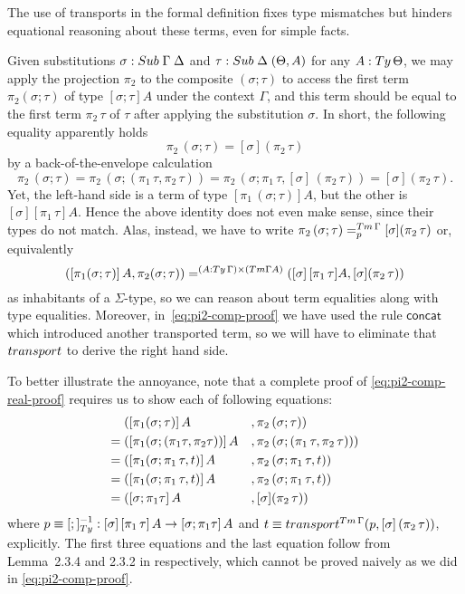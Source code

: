 \documentclass[a4paper,UKenglish,numberwithinsect,cleveref,thm-restate]{lipics-v2021}
\begin{document}
The use of transports in the formal definition fixes type mismatches but hinders equational reasoning about these terms, even for simple facts.
\begin{example}
  Given substitutions $\sigma : \Sub\;\Gamma\; \Delta$ and $\tau : \Sub\;\Delta\;(\Theta, A)$ for any $A : \Ty\,\Theta$, we may apply the projection $\pi_2$ to the composite $(\sigma; \tau)$ to access the first term $\pi_2(\sigma; \tau)$ of type $[\sigma;\tau] A$ under the context $\Gamma$, and this term should be equal to the first term $\pi_2\,\tau$ of $\tau$ after applying the substitution $\sigma$. 
  In short, the following equality apparently holds
  \[
    \pi_2\,(\sigma ; \tau) = [\sigma] (\pi_2\,\tau)
  \]
  by a back-of-the-envelope calculation
  \begin{equation} \label{eq:pi2-comp-proof}
    \pi_2\,(\sigma ; \tau) 
    = \pi_2\,(\sigma; (\pi_1\,\tau, \pi_2\,\tau))
    = \pi_2\,(\sigma;\pi_1\,\tau, [\sigma]\,(\pi_2\,\tau))
    = [\sigma] (\pi_2\,\tau).
  \end{equation}
  Yet, the left-hand side is a term of type $[\pi_1\,(\sigma;\tau)] A$, but the other is $[\sigma] [\pi_1\,\tau] A$.
  Hence the above identity does not even make sense, since their types do not match.
  Alas, instead, we have to write $\pi_2\,(\sigma ; \tau) =^{\Tm\,\Gamma}_{p} [\sigma] (\pi_2\,\tau)$ or, equivalently
  \begin{equation}\label{eq:pi2-comp-real-proof}
    ([\pi_1(\sigma; \tau)]\,A, \pi_2(\sigma; \tau)) =^{(A : \Ty\,\Gamma) \times (\Tm \Gamma A)} ([\sigma]\,[\pi_1\,\tau]A, [\sigma] (\pi_2\,\tau))
  \end{equation}
  as inhabitants of a $\Sigma$-type, so we can reason about term equalities along with type equalities.
  Moreover, in~\eqref{eq:pi2-comp-proof} we have used the rule $\mathsf{concat}$ which introduced another transported term, so we will have to eliminate that $\transp$ to derive the right hand side.

  To better illustrate the annoyance, note that a complete proof of \eqref{eq:pi2-comp-real-proof} requires us to show each of following equations:
  \begin{alignat*}{3}
         & ([\pi_1(\sigma; \tau)]\,A                    &&, \pi_2\,(\sigma ; \tau)) \label{eq:pi2-proof-1} \\
    = {} & ([\pi_1(\sigma; (\pi_1\tau , \pi_2\tau))]\,A &&, \pi_2\,(\sigma; (\pi_1\,\tau, \pi_2\,\tau))) \\
    = {} & ([\pi_1(\sigma;\pi_1\,\tau, t)]\,A &&, \pi_2\,(\sigma;\pi_1\,\tau, t)) \\
    = {} & ([\pi_1(\sigma;\pi_1\,\tau, t)]\,A &&, \pi_2\,(\sigma;\pi_1\,\tau, t)) \nonumber \\
    = {} & ([\sigma;\pi_1\tau]\,{A} &&, [\sigma] (\pi_2\,\tau)) \nonumber
  \end{alignat*}
  where $p \judgeq [;]_{\Ty}^{-1} : \sub{\sigma}{\sub{\pi_1\,\tau}{A}} \to \sub{\sigma; \pi_1 \tau}{A}$ and $t \judgeq\transfib{\Tm\,\Gamma}{p}{[\sigma]\,(\pi_2\,\tau)}$,
explicitly.
The first three equations and the last equation follow from Lemma~2.3.4 and 2.3.2 in \cite{UFP2013} respectively, which cannot be proved naively as we did in \eqref{eq:pi2-comp-proof}.
\end{example}
\end{document}
